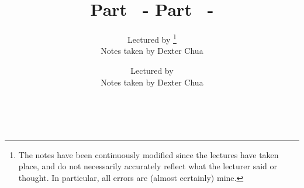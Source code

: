 \ifx \nhtml \undefined
  \author{Lectured by \nlecturer\footnote{The notes have been continuously modified since the lectures have taken place, and do not necessarily accurately reflect what the lecturer said or thought. In particular, all errors are (almost certainly) mine.} \\\small Notes taken by Dexter Chua}
\else
  \author{Lectured by \nlecturer \\\small Notes taken by Dexter Chua}
\fi
\date{\nterm\ \nyear}

\usepackage{alltt}
\usepackage{amsfonts}
\usepackage{amsmath}
\usepackage{amssymb}
\usepackage{amsthm}
\usepackage{booktabs}
\usepackage{caption}
\usepackage{enumitem}
\usepackage{fancyhdr}
\usepackage{graphicx}
\usepackage{mathdots}
\usepackage{mathtools}
\usepackage{microtype}
\usepackage{multirow}
\usepackage{pdflscape}
\usepackage{pgfplots}
\usepackage{siunitx}
\usepackage{tabularx}
\usepackage{tikz}
\usepackage{tkz-euclide}
\usepackage[normalem]{ulem}
\usepackage[all]{xy}
\usepackage{imakeidx}

\makeindex[intoc, title=Index]

\ifx \nextra \undefined
  \usepackage[pdftex,
    hidelinks,
    pdfauthor={Dexter Chua},
    pdfsubject={Cambridge Maths Notes: Part \npart\ - \ncourse},
    pdftitle={Part \npart\ - \ncourse},
  pdfkeywords={Cambridge Mathematics Maths Math \npart\ \nterm\ \nyear\ \ncourse}]{hyperref}
  \title{Part \npart\ - \ncourse}
\else
  \usepackage[pdftex,
    hidelinks,
    pdfauthor={Dexter Chua},
    pdfsubject={Cambridge Maths Notes: Part \npart\ - \ncourse\ (\nextra)},
    pdftitle={Part \npart\ - \ncourse\ (\nextra)},
  pdfkeywords={Cambridge Mathematics Maths Math \npart\ \nterm\ \nyear\ \ncourse\ \nextra}]{hyperref}

  \title{Part \npart\ - \ncourse \\ {\Large \nextra}}
\fi

\pgfplotsset{compat=1.12}

\pagestyle{fancyplain}
\lhead{\emph{\nouppercase{\leftmark}}}
\ifx \nextra \undefined
  \rhead{
    \ifnum\thepage=1
    \else
      \npart\ \ncourse
    \fi}
\else
  \rhead{
    \ifnum\thepage=1
    \else
      \npart\ \ncourse\ (\nextra)
    \fi}
\fi
\usetikzlibrary{arrows}
\usetikzlibrary{decorations.markings}
\usetikzlibrary{decorations.pathmorphing}
\usetikzlibrary{positioning}
\usetikzlibrary{fadings}
\usetikzlibrary{intersections}
\usetikzlibrary{cd}

\newcommand*{\Cdot}{\raisebox{-0.25ex}{\scalebox{1.5}{$\cdot$}}}
\newcommand {\pd}[2][ ]{
  \ifx #1 { }
    \frac{\partial}{\partial #2}
  \else
    \frac{\partial^{#1}}{\partial #2^{#1}}
  \fi
}
\ifx \nhtml \undefined
\else
  \renewcommand\printindex{}
  \makeatletter
  \let\Contentsline\contentsline
  \renewcommand\contentsline[3]{\Contentsline{#1}{#2}{}}
  \renewcommand{\@dotsep}{10000}
  \newlength\currentparindent
  \setlength\currentparindent\parindent

